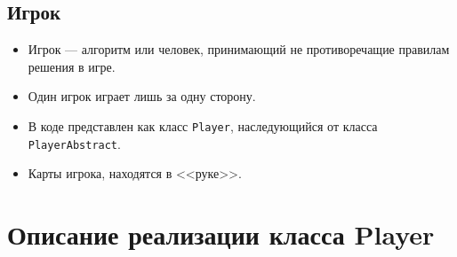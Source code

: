 \documentclass[a4paper,12pt]{article}
\begin{document}
        \subsection{Игрок}
            \begin{itemize}
                \item[] Игрок --- алгоритм или человек, принимающий не противоречащие правилам решения в игре.
                \item[] Один игрок играет лишь за одну сторону.
				\item[] В коде представлен как класс \texttt{Player}, наследующийся от класса \texttt{PlayerAbstract}.
				\item[] Карты игрока, находятся в <<руке>>.
            \end{itemize}
    
    \section{Описание реализации класса Player}
\end{document}

